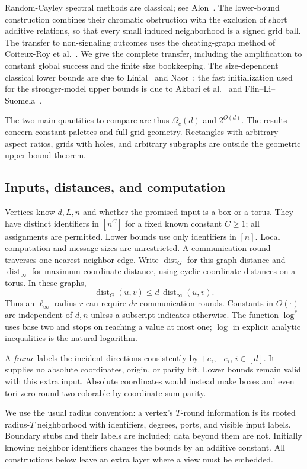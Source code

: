 \documentclass[11pt]{article}
\theoremstyle{definition}\newtheorem{definition}[theorem]{Definition}
\theoremstyle{remark}\newtheorem{remark}[theorem]{Remark}
\newcommand{\dist}{\operatorname{dist}}
\newcommand{\ls}{\log^*}
\begin{document}
Random-Cayley spectral methods are classical; see
Alon~\cite{Alon}. The lower-bound construction combines their
chromatic obstruction with the exclusion of short additive relations,
so that every small induced neighborhood is a signed grid ball.
The transfer to non-signaling outcomes uses the cheating-graph method
of Coiteux-Roy et al.~\cite{NScolor}. We give the complete transfer,
including the amplification to constant global success and the finite
size bookkeeping. The size-dependent classical lower bounds are due
to Linial~\cite{Linial} and Naor~\cite{Naor}; the fast initialization
used for the stronger-model upper bounds is due to
Akbari et al.~\cite{OnlineQuantum} and
Flin--Li--Suomela~\cite{QuantumBreak}.

The two main quantities to compare are thus $\Omega_c(d)$ and
$2^{O(d)}$. The results concern constant palettes and full grid
geometry. Rectangles with arbitrary aspect ratios, grids with holes,
and arbitrary subgraphs are outside the geometric upper-bound theorem.

\subsection{Inputs, distances, and computation}

Vertices know $d,L,n$ and whether the promised input is a box or a
torus. They have distinct identifiers in $[n^C]$ for a fixed known
constant $C\ge1$; all assignments are permitted. Lower bounds use
only identifiers in $[n]$. Local computation and message sizes are
unrestricted. A communication round traverses one nearest-neighbor
edge. Write $\dist_G$ for this graph distance and $\dist_\infty$ for
maximum coordinate distance, using cyclic coordinate distances on a
torus. In these graphs,
\[
              \dist_G(u,v)\le d\,\dist_\infty(u,v).
\]
Thus an $\ell_\infty$ radius $r$ can require $dr$ communication
rounds. Constants in $O(\cdot)$ are independent of $d,n$ unless a
subscript indicates otherwise. The function $\ls$ uses base two and
stops on reaching a value at most one; $\log$ in explicit analytic
inequalities is the natural logarithm.

A \emph{frame} labels the incident directions consistently by
$+e_i,-e_i$, $i\in[d]$. It supplies no absolute coordinates, origin,
or parity bit. Lower bounds remain valid with this extra input.
Absolute coordinates would instead make boxes and even tori
zero-round two-colorable by coordinate-sum parity.

We use the usual radius convention: a vertex's $T$-round information
is its rooted radius-$T$ neighborhood with identifiers, degrees, ports,
and visible input labels. Boundary stubs and their labels are included;
data beyond them are not. Initially knowing neighbor identifiers
changes the bounds by an additive constant. All constructions below
leave an extra layer where a view must be embedded.
\end{document}

